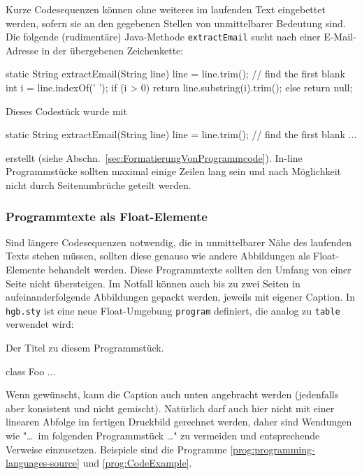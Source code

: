 Kurze Codesequenzen können ohne weiteres im laufenden Text eingebettet
werden, sofern sie an den gegebenen Stellen von unmittelbarer Bedeutung sind.
Die folgende (rudimentäre) Java-Methode \texttt{extractEmail} sucht nach
einer E-Mail-Adresse in der übergebenen Zeichenkette:
%
\begin{JavaCode}[numbers=none]
static String extractEmail(String line) {
    line = line.trim(); // find the first blank
    int i = line.indexOf(' '); 
    if (i > 0)
        return line.substring(i).trim();
    else
        return null;
}
\end{JavaCode}
%
\noindent
Dieses Codestück wurde mit 
%
\begin{LaTeXCode}[numbers=none]
\begin{JavaCode}[numbers=none]
static String extractEmail(String line) {
    line = line.trim(); // find the first blank
    ...
}
\end{JavaCode}
\end{LaTeXCode}
%
erstellt (siehe Abschn.\ \ref{sec:FormatierungVonProgrammcode}). In-line
Programmstücke sollten maximal einige Zeilen lang sein und nach Möglichkeit
nicht durch Seitenumbrüche geteilt werden.


\subsubsection{Programmtexte als Float-Elemente}

Sind längere Codesequenzen notwendig, die in unmittelbarer Nähe des laufenden
Texts stehen müssen, sollten diese genauso wie andere Abbildungen als
Float-Elemente behandelt werden. Diese Programmtexte sollten den Umfang von
einer Seite nicht übersteigen. Im Notfall können auch bis zu zwei Seiten in
aufeinanderfolgende Abbildungen gepackt werden, jeweils mit eigener Caption.
In \texttt{hgb.sty} ist eine neue Float-Umgebung \texttt{program} definiert,
die analog zu \texttt{table} verwendet wird:
%
\begin{LaTeXCode}[numbers=none]
\begin{program}
\caption{Der Titel zu diesem Programmstück.}
\label{prog:xyz}
\begin{JavaCode}
  class Foo {
    ...
  }
\end{JavaCode}
\end{program}
\end{LaTeXCode}
%
Wenn gewünscht, kann die Caption auch unten angebracht werden (jedenfalls
aber konsistent und nicht gemischt). Natürlich darf auch hier nicht mit einer
linearen Abfolge im fertigen Druckbild gerechnet werden, daher sind Wendungen
wie "\ldots\ im folgenden Programmstück \ldots" zu vermeiden und
entsprechende Verweise einzusetzen. Beispiele sind die Programme
\ref{prog:programming-languages-source} und \ref{prog:CodeExample}.

